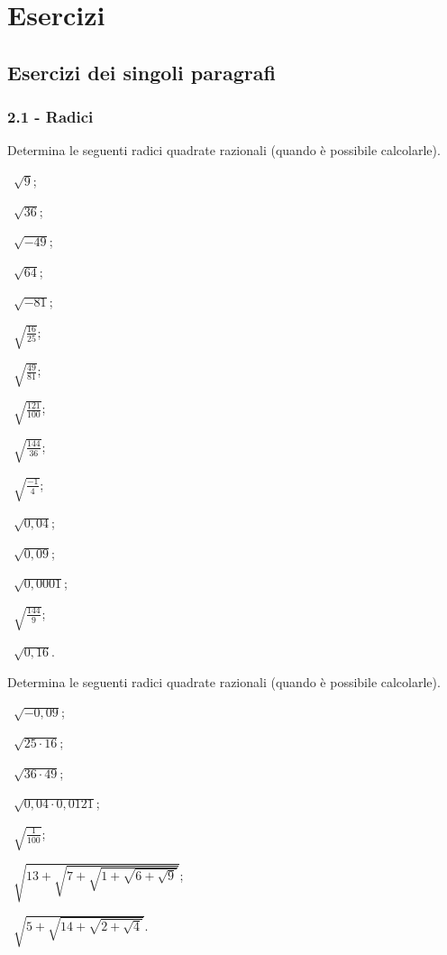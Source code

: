 \section{Esercizi}
\subsection{Esercizi dei singoli paragrafi}
\subsubsection*{2.1 - Radici}


\begin{esercizio}
 \label{ese:2.1}
Determina le seguenti radici quadrate razionali (quando è possibile calcolarle).
\begin{multicols}{3}
 \begin{enumeratea}
 \item~$\sqrt 9$;
 \item~$\sqrt{36}$;
 \item~$\sqrt{-49}$;
 \item~$\sqrt{64}$;
 \item~$\sqrt{-81}$;
 \item~$\sqrt{\frac{16}{25}}$;
 \item~$\sqrt{\frac{49}{81}}$;
 \item~$\sqrt{\frac{121}{100}}$;
 \item~$\sqrt{\frac{144}{36}}$;
 \item~$\sqrt{\frac{-1} 4}$;
 \item~$\sqrt{0,04}$;
 \item~$\sqrt{0,09}$;
 \item~$\sqrt{0,0001}$;
 \item~$\sqrt{\frac{144} 9}$;
 \item~$\sqrt{0,16}$.
 \end{enumeratea}
 \end{multicols}
\end{esercizio}

\begin{esercizio}
 \label{ese:2.2}
Determina le seguenti radici quadrate razionali (quando è possibile calcolarle).
\begin{multicols}{2}
 \begin{enumeratea}
 \item~$\sqrt{-0,09}$;
 \item~$\sqrt{25\cdot 16}$;
 \item~$\sqrt{36\cdot 49}$;
 \item~$\sqrt{0,04\cdot 0,0121}$;
 \item~$\sqrt{\frac 1{100}}$;
 \item~$\sqrt{13+\sqrt{7+\sqrt{1+\sqrt{6+\sqrt 9}}}}$;
 \item~$\sqrt{5+\sqrt{14+\sqrt{2+\sqrt 4}}}$.
 \end{enumeratea}
 \end{multicols}
\end{esercizio}


